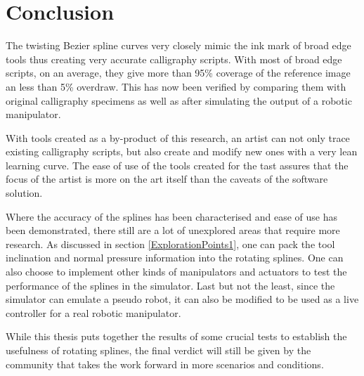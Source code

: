 \section{Conclusion}
\label{Chapter:Conclusion}
{
    The twisting Bezier spline curves very closely mimic the ink mark of broad edge tools thus creating very accurate calligraphy scripts. With most of broad edge scripts, on an average, they give more than 95\% coverage of the reference image an less than 5\% overdraw. This has now been verified by comparing them with original calligraphy specimens as well as after simulating the output of a robotic manipulator.

    With tools created as a by-product of this research, an artist can not only trace existing calligraphy scripts, but also create and modify new ones with a very lean learning curve. The ease of use of the tools created for the tast assures that the focus of the artist is more on the art itself than the caveats of the software solution.

    Where the accuracy of the splines has been characterised and ease of use has been demonstrated, there still are a lot of unexplored areas that require more research. As discussed in section \ref{ExplorationPoints1}, one can pack the tool inclination and normal pressure information into the rotating splines. One can also choose to implement other kinds of manipulators and actuators to test the performance of the splines in the simulator. Last but not the least, since the simulator can emulate a pseudo robot, it can also be modified to be used as a live controller for a real robotic manipulator.

    While this thesis puts together the results of some crucial tests to establish the usefulness of rotating splines, the final verdict will still be given by the community that takes the work forward in more scenarios and conditions.
}
\clearpage 